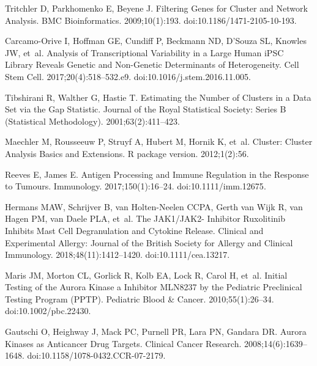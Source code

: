 \documentclass[10pt,letterpaper]{article}
\begin{document}
\begin{thebibliography}{10}
	Tritchler D, Parkhomenko E, Beyene J.
	\newblock Filtering {{Genes}} for {{Cluster}} and {{Network Analysis}}.
	\newblock BMC Bioinformatics. 2009;10(1):193.
	\newblock doi:{10.1186/1471-2105-10-193}.
	
	{Carcamo-Orive} I, Hoffman GE, Cundiff P, Beckmann ND, D'Souza SL, Knowles JW,
	et~al.
	\newblock Analysis of {{Transcriptional Variability}} in a {{Large Human iPSC
			Library Reveals Genetic}} and {{Non}}-Genetic {{Determinants}} of
	{{Heterogeneity}}.
	\newblock Cell Stem Cell. 2017;20(4):518--532.e9.
	\newblock doi:{10.1016/j.stem.2016.11.005}.
	
	Tibshirani R, Walther G, Hastie T.
	\newblock Estimating the Number of Clusters in a Data Set via the Gap
	Statistic.
	\newblock Journal of the Royal Statistical Society: Series B (Statistical
	Methodology). 2001;63(2):411--423.
	
	Maechler M, Rousseeuw P, Struyf A, Hubert M, Hornik K, et~al.
	\newblock Cluster: Cluster Analysis Basics and Extensions.
	\newblock R package version. 2012;1(2):56.
	
	Reeves E, James E.
	\newblock Antigen Processing and Immune Regulation in the Response to Tumours.
	\newblock Immunology. 2017;150(1):16--24.
	\newblock doi:{10.1111/imm.12675}.
	
	Hermans MAW, Schrijver B, {van Holten-Neelen} CCPA, {Gerth van Wijk} R, {van
		Hagen} PM, {van Daele} PLA, et~al.
	\newblock The {{JAK1}}/{{JAK2}}- Inhibitor Ruxolitinib Inhibits Mast Cell
	Degranulation and Cytokine Release.
	\newblock Clinical and Experimental Allergy: Journal of the British Society for
	Allergy and Clinical Immunology. 2018;48(11):1412--1420.
	\newblock doi:{10.1111/cea.13217}.
	
	Maris JM, Morton CL, Gorlick R, Kolb EA, Lock R, Carol H, et~al.
	\newblock Initial Testing of the Aurora Kinase a Inhibitor {{MLN8237}} by the
	{{Pediatric Preclinical Testing Program}} ({{PPTP}}).
	\newblock Pediatric Blood \& Cancer. 2010;55(1):26--34.
	\newblock doi:{10.1002/pbc.22430}.
	
	Gautschi O, Heighway J, Mack PC, Purnell PR, Lara PN, Gandara DR.
	\newblock Aurora {{Kinases}} as {{Anticancer Drug Targets}}.
	\newblock Clinical Cancer Research. 2008;14(6):1639--1648.
	\newblock doi:{10.1158/1078-0432.CCR-07-2179}.
	

\end{thebibliography}
\end{document}
